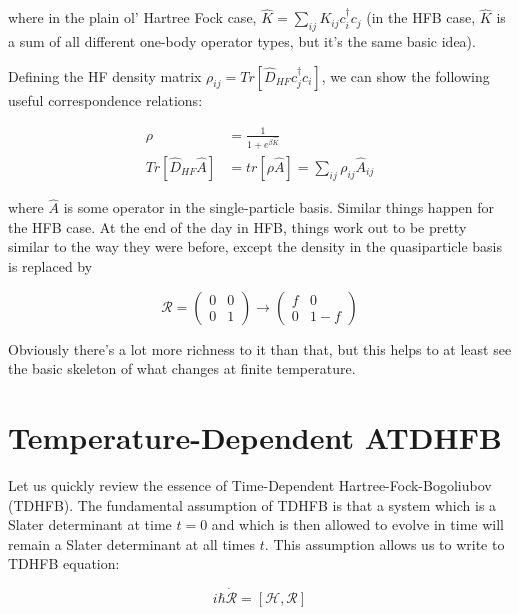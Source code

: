 \noindent where in the plain ol' Hartree Fock case, $\hat{K} = \sum_{ij}K_{ij}c_i^\dagger c_j$ (in the HFB case, $\hat{K}$ is a sum of all different one-body operator types, but it's the same basic idea).

Defining the HF density matrix $\rho_{ij}=Tr\left[\hat{D}_{HF}c_j^\dagger c_i\right]$, we can show the following useful correspondence relations:

\begin{align*}
\rho &= \frac{1}{1+e^{\beta\hat{K}}} \\
Tr\left[\hat{D}_{HF}\hat{A}\right] &= tr\left[\rho\hat{A}\right] = \sum_{ij}\rho_{ij}\hat{A}_{ij}
\end{align*}

\noindent where $\hat{A}$ is some operator in the single-particle basis. Similar things happen for the HFB case. At the end of the day in HFB, things work out to be pretty similar to the way they were before, except the density in the quasiparticle basis is replaced by

\begin{equation*}
\mathcal{R} =
\left(\begin{array}{cc}
0 & 0 \\
0 & 1
\end{array}\right)
\rightarrow
\left(\begin{array}{cc}
f & 0 \\
0 & 1-f
\end{array}\right)
\end{equation*}

\noindent Obviously there's a lot more richness to it than that, but this helps to at least see the basic skeleton of what changes at finite temperature.

\section*{Temperature-Dependent ATDHFB}

Let us quickly review the essence of Time-Dependent Hartree-Fock-Bogoliubov (TDHFB). The fundamental assumption of TDHFB is that a system which is a Slater determinant at time $t=0$ and which is then allowed to evolve in time will remain a Slater determinant at all times $t$. This assumption allows us to write to TDHFB equation:

\begin{equation*}
i\hbar \mathcal{\dot{R}} = \left[\mathcal{H},\mathcal{R}\right]
\end{equation*}

